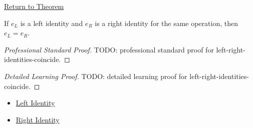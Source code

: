 \newpage
{}
\label{prf:left-right-identities-coincide}

\begin{remark*}[Return]
\hyperref[lem:left-right-identities-coincide]{Return to Theorem}
\end{remark*}

\begin{lemma*}
If $e_L$ is a left identity and $e_R$ is a right identity for the same
operation, then $e_L=e_R$.
\end{lemma*}

\begin{proof}[Professional Standard Proof]
\LRAProofBodyStart
TODO: professional standard proof for left-right-identities-coincide.
\end{proof}

\begin{proof}[Detailed Learning Proof]
\LRAProofBodyStart
TODO: detailed learning proof for left-right-identities-coincide.
\end{proof}

\begin{remark*}
\end{remark*}

\begin{dependencies}
\begin{itemize}
  \item \hyperref[def:left-identity]{Left Identity}
  \item \hyperref[def:right-identity]{Right Identity}
\end{itemize}
\end{dependencies}

\clearpage
